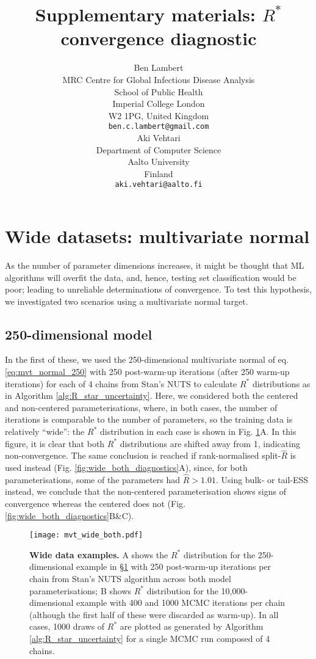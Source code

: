 \documentclass{article}
\title{Supplementary materials: $R^*$ convergence diagnostic}
\author{%
	Ben Lambert\\
	MRC Centre for Global Infectious Disease Analysis\\
	School of Public Health\\
	Imperial College London\\
	W2 1PG, United Kingdom\\
	\texttt{ben.c.lambert@gmail.com} \\
	\And
	Aki Vehtari \\
	Department of Computer Science\\
	Aalto University\\
	Finland\\
	\texttt{aki.vehtari@aalto.fi}
}
\begin{document}
	\maketitle

\section{Wide datasets: multivariate normal}\label{sec:wide}
As the number of parameter dimensions increases, it might be thought that ML algorithms will overfit the data, and, hence, testing set classification would be poor; leading to unreliable determinations of convergence. To test this hypothesis, we investigated two scenarios using a multivariate normal target.

\subsection{250-dimensional model}
In the first of these, we used the 250-dimensional multivariate normal of eq. \eqref{eq:mvt_normal_250} with 250 post-warm-up iterations (after 250 warm-up iterations) for each of 4 chains from Stan's NUTS to calculate $R^*$ distributions as in Algorithm \ref{alg:R_star_uncertainty}. Here, we considered both the centered and non-centered parameterisations, where, in both cases, the number of iterations is comparable to the number of parameters, so the training data is relatively ``wide'': the $R^*$ distribution in each case is shown in Fig. \ref{fig:mvt_wide_both}A. In this figure, it is clear that both $R^*$ distributions are shifted away from 1, indicating non-convergence. The same conclusion is reached if rank-normalised split-$\widehat{R}$ is used instead (Fig. \ref{fig:wide_both_diagnostics}A), since, for both parameterisations, some of the parameters had $\widehat{R}>1.01$. Using bulk- or tail-ESS instead, we conclude that the non-centered parameterisation shows signs of convergence whereas the centered does not (Fig. \ref{fig:wide_both_diagnostics}B\&C). 

\begin{figure}[!htb]
	\centerline{\texttt{[image: mvt\_wide\_both.pdf]}}
	\caption{\textbf{Wide data examples.} A shows the $R^*$ distribution for the 250-dimensional example in \S\ref{sec:wide} with 250 post-warm-up iterations per chain from Stan's NUTS algorithm across both model parameterisations; B shows $R^*$ distribution for the 10,000-dimensional example with 400 and 1000 MCMC iterations per chain (although the first half of these were discarded as warm-up). In all cases, 1000 draws of $R^*$ are plotted as generated by Algorithm \ref{alg:R_star_uncertainty} for a single MCMC run composed of 4 chains.}
	\label{fig:mvt_wide_both}
\end{figure}
\end{document}
